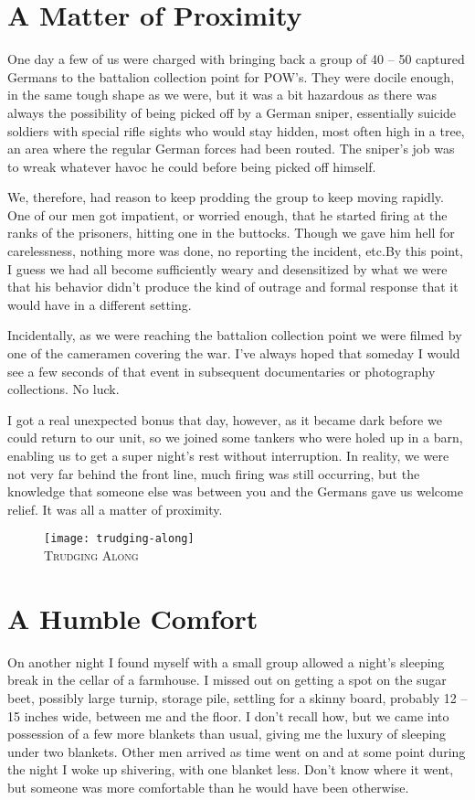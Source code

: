 \documentclass[../m3y]{subfiles}
\begin{document}
\section{A Matter of Proximity}
One day a few of us were charged with bringing back a group of 40 -- 50 captured Germans to the battalion collection point for POW's. They were docile enough, in the same tough shape as we were, but it was a bit hazardous as there was always the possibility of being picked off by a German sniper, essentially suicide soldiers with special rifle sights who would stay hidden, most often high in a tree, an area where the regular German forces had been routed. The sniper's job was to wreak whatever havoc he could before being picked off himself.

We, therefore, had reason to keep prodding the group to keep moving rapidly. One of our men got impatient, or worried enough, that he started firing at the ranks of the prisoners, hitting one in the buttocks. Though we gave him hell for carelessness, nothing more was done, no reporting the incident, etc.\@ By this point, I guess we had all become sufficiently weary and desensitized by what we were that his behavior didn't produce the kind of outrage and formal response that it would have in a different setting.

Incidentally, as we were reaching the battalion collection point we were filmed by one of the cameramen covering the war. I've always hoped that someday I would see a few seconds of that event in subsequent documentaries or photography collections. No luck.

I got a real unexpected bonus that day, however, as it became dark before we could return to our unit, so we joined some tankers who were holed up in a barn, enabling us to get a super night's rest without interruption. In reality, we were not very far behind the front line, much firing was still occurring, but the knowledge that someone else was between you and the Germans gave us welcome relief. It was all a matter of proximity.

\begin{figure}[h]
\centering
\texttt{[image: trudging-along]}\\
\medskip
{\newtimes\textsc{Trudging Along}}
\end{figure}

\section{A Humble Comfort}
On another night I found myself with a small group allowed a night's sleeping break in the cellar of a farmhouse. I missed out on getting a spot on the sugar beet, possibly large turnip, storage pile, settling for a skinny board, probably 12 -- 15 inches wide, between me and the floor. I don't recall how, but we came into possession of a few more blankets than usual, giving me the luxury of sleeping under two blankets. Other men arrived as time went on and at some point during the night I woke up shivering, with one blanket less. Don't know where it went, but someone was more comfortable than he would have been otherwise.
\end{document}
